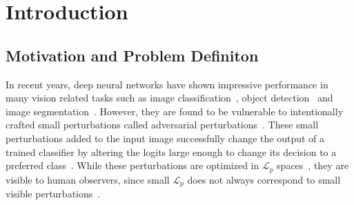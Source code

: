 \chapter{Introduction}
\label{chp:1_introduction}

\section{Motivation and Problem Definiton}
In recent years, deep neural networks have shown impressive performance in many vision related tasks such as image classification~\cite{he2015deep}, object detection~\cite{redmon2018yolov3} and image segmentation~\cite{long2015fully}. However, they are found to be vulnerable to intentionally crafted small perturbations called adversarial perturbations~\cite{szegedy2013intriguing}. These small perturbations added to the input image successfully change the output of a trained classifier by altering the logits large enough to change its decision to a preferred class~\cite{goodfellow2014explaining}. While these perturbations are optimized in \(\mathcal{L}_p\) spaces~\cite{carlini2017towards}, they are visible to human observers, since small \(\mathcal{L}_p\) does not always correspond to small visible perturbations~\cite{jordan2019quantifying,engstrom2018rotation}.

